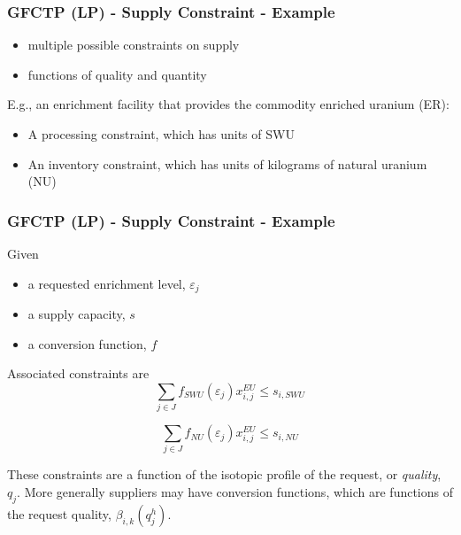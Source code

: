 \begin{frame}[ctb!]
  \frametitle{GFCTP (LP) - Supply Constraint - Example}
  
  \begin{itemize}
    \item multiple possible constraints on supply
    \item functions of quality and quantity
  \end{itemize}

  E.g., an enrichment facility that provides the commodity enriched uranium (ER):
  \begin{itemize}
    \item A processing constraint, which has units of SWU
    \item An inventory constraint, which has units of kilograms of natural
      uranium (NU)
  \end{itemize}

\end{frame}

\begin{frame}[ctb!]
  \frametitle{GFCTP (LP) - Supply Constraint - Example}
  
  Given
  \begin{itemize}
    \item a requested enrichment level, $\varepsilon_j$
    \item a supply capacity, $s$
    \item a conversion function, $f$
  \end{itemize}

  Associated constraints are
  \begin{equation}
    \sum_{j \in J} f_{SWU}(\varepsilon_j) x_{i,j}^{EU} \leq s_{i,SWU} 
  \end{equation}

  \begin{equation}
    \sum_{j \in J} f_{NU}(\varepsilon_j) x_{i,j}^{EU} \leq s_{i,NU} 
  \end{equation}

  \pause

  These constraints are a function of the isotopic profile of the request, or
  \textit{quality}, $q_j$. More generally suppliers may have conversion
  functions, which are functions of the request quality,
  $\beta_{i,k}(q_{j}^{h})$.

\end{frame}

